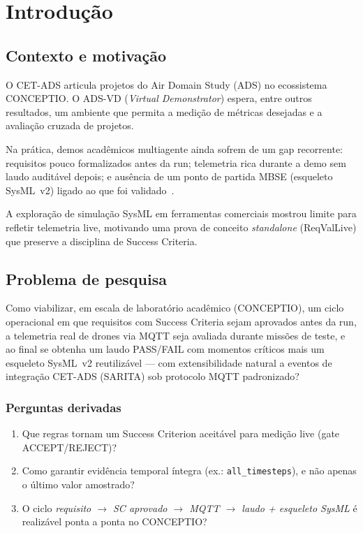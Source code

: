 \chapter{Introdução}
\label{cap:introducao}


\section{Contexto e motivação}
\label{sec:contexto}

O CET-ADS articula projetos do Air Domain Study (ADS) no ecossistema CONCEPTIO.
O ADS-VD (\emph{Virtual Demonstrator}) espera, entre outros resultados, um ambiente
que permita a medição de métricas desejadas e a avaliação cruzada de projetos.

Na prática, demos acadêmicos multiagente ainda sofrem de um gap recorrente:
requisitos pouco formalizados antes da run; telemetria rica durante a demo sem
laudo auditável depois; e ausência de um ponto de partida MBSE (esqueleto
SysML~v2) ligado ao que foi validado~\cite{sis08methods}.

A exploração de simulação SysML em ferramentas comerciais mostrou limite para
refletir telemetria live, motivando uma prova de conceito \emph{standalone}
(ReqValLive) que preserve a disciplina de Success Criteria.

\section{Problema de pesquisa}
\label{sec:problema}

Como viabilizar, em escala de laboratório acadêmico (CONCEPTIO), um ciclo
operacional em que requisitos com Success Criteria sejam aprovados antes da run,
a telemetria real de drones via MQTT seja avaliada durante missões de teste, e
ao final se obtenha um laudo PASS/FAIL com momentos críticos mais um esqueleto
SysML~v2 reutilizável --- com extensibilidade natural a eventos de integração
CET-ADS (SARITA) sob protocolo MQTT padronizado?

\subsection{Perguntas derivadas}

\begin{enumerate}
  \item Que regras tornam um Success Criterion aceitável para medição live
        (gate ACCEPT/REJECT)?
  \item Como garantir evidência temporal íntegra (ex.: \texttt{all\_timesteps}),
        e não apenas o último valor amostrado?
  \item O ciclo \emph{requisito $\rightarrow$ SC aprovado $\rightarrow$ MQTT $\rightarrow$
        laudo + esqueleto SysML} é realizável ponta a ponta no CONCEPTIO?
\end{enumerate}

